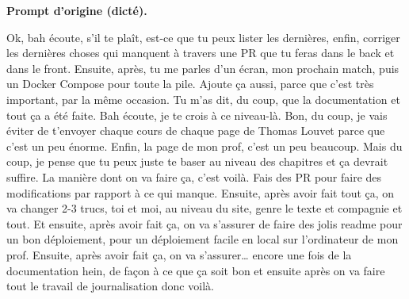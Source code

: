 \documentclass[11pt,a4paper]{article}
\begin{document}
\begin{prompt}
\textbf{Prompt d'origine (dicté).}\par\vspace{0.3em}
Ok, bah écoute, s'il te plaît, est-ce que tu peux lister les dernières, enfin, corriger les dernières choses qui manquent à travers une PR que tu feras dans le back et dans le front. Ensuite, après, tu me parles d'un écran, mon prochain match, puis un Docker Compose pour toute la pile. Ajoute ça aussi, parce que c'est très important, par la même occasion. Tu m'as dit, du coup, que la documentation et tout ça a été faite. Bah écoute, je te crois à ce niveau-là. Bon, du coup, je vais éviter de t'envoyer chaque cours de chaque page de Thomas Louvet parce que c'est un peu énorme. Enfin, la page de mon prof, c'est un peu beaucoup. Mais du coup, je pense que tu peux juste te baser au niveau des chapitres et ça devrait suffire. La manière dont on va faire ça, c'est voilà. Fais des PR pour faire des modifications par rapport à ce qui manque. Ensuite, après avoir fait tout ça, on va changer 2-3 trucs, toi et moi, au niveau du site, genre le texte et compagnie et tout. Et ensuite, après avoir fait ça, on va s'assurer de faire des jolis readme pour un bon déploiement, pour un déploiement facile en local sur l'ordinateur de mon prof. Ensuite, après avoir fait ça, on va s'assurer\ldots{} encore une fois de la documentation hein, de façon à ce que ça soit bon et ensuite après on va faire tout le travail de journalisation donc voilà.
\end{prompt}
\end{document}
